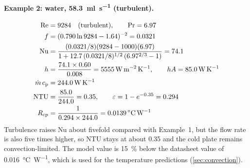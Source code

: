 \paragraph{Example 2: water, \SI{58.3}{\milli\litre\per\second} (turbulent).}
\begin{align*}
  \mathrm{Re} &= 9284 \quad\text{(turbulent)},
    \qquad \mathrm{Pr} = 6.97\\
  f &= (0.790\ln 9284 - 1.64)^{-2} = 0.0321\\
  \mathrm{Nu} &= \frac{(0.0321/8)(9284 - 1000)(6.97)}
                      {1 + 12.7\,(0.0321/8)^{1/2}\,(6.97^{2/3} - 1)} = 74.1\\
  h &= \frac{74.1 \times 0.60}{0.008} = \SI{5555}{\watt\per\metre\squared\per\kelvin},
    \qquad hA = \SI{85.0}{\watt\per\kelvin}\\
  \dot{m}\,c_{\mathrm{p}} &= \SI{244.0}{\watt\per\kelvin}\\
  \mathrm{NTU} &= \frac{85.0}{244.0} = 0.35,
    \qquad \varepsilon = 1 - e^{-0.35} = 0.294\\
  R_{\mathrm{cp}} &= \frac{1}{0.294 \times 244.0} = \SI{0.0139}{\celsius\per\watt}
\end{align*}
Turbulence raises Nu about fivefold compared with Example~1, but the flow rate
is also five times higher, so NTU stays at about 0.35 and the cold plate remains
convection-limited. The model value is \SI{15}{\percent} below the datasheet
value of \SI{0.016}{\celsius\per\watt}, which is used for the temperature
predictions (\cref{sec:convection}).


